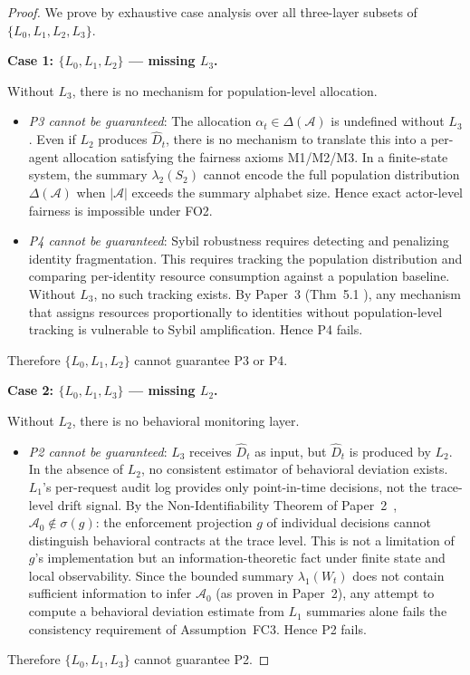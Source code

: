 \documentclass[11pt]{article}
\newcommand{\Agents}{\mathcal{A}}
\newcommand{\Dhat}{\widehat{D}}
\newcommand{\Azero}{\mathcal{A}_0}
\newcommand{\Layer}[1]{L_{#1}}
\newcommand{\State}[1]{S_{#1}}
\newcommand{\Sum}[1]{\lambda_{#1}}
\begin{document}
\begin{proof}
We prove by exhaustive case analysis over all three-layer subsets of
$\{\Layer{0}, \Layer{1}, \Layer{2}, \Layer{3}\}$.

\medskip
\noindent\textbf{Case 1: $\{\Layer{0}, \Layer{1}, \Layer{2}\}$ --- missing
$\Layer{3}$.}

Without $\Layer{3}$, there is no mechanism for population-level allocation.
\begin{itemize}[noitemsep]
  \item \emph{P3 cannot be guaranteed}: The allocation $\alpha_t \in
    \Delta(\Agents)$ is undefined without $\Layer{3}$. Even if $\Layer{2}$
    produces $\Dhat_t$, there is no mechanism to translate this into a
    per-agent allocation satisfying the fairness axioms M1/M2/M3. In a
    finite-state system, the summary $\Sum{2}(\State{2})$ cannot encode the
    full population distribution $\Delta(\Agents)$ when $|\Agents|$ exceeds
    the summary alphabet size. Hence exact actor-level fairness is impossible
    under FO2.

  \item \emph{P4 cannot be guaranteed}: Sybil robustness requires detecting
    and penalizing identity fragmentation. This requires tracking the
    population distribution and comparing per-identity resource consumption
    against a population baseline. Without $\Layer{3}$, no such tracking
    exists. By Paper~3 (Thm~5.1 \cite{fairgov26}), any mechanism that assigns
    resources proportionally to identities without population-level tracking
    is vulnerable to Sybil amplification. Hence P4 fails.
\end{itemize}
Therefore $\{\Layer{0},\Layer{1},\Layer{2}\}$ cannot guarantee P3 or P4.

\medskip
\noindent\textbf{Case 2: $\{\Layer{0}, \Layer{1}, \Layer{3}\}$ --- missing
$\Layer{2}$.}

Without $\Layer{2}$, there is no behavioral monitoring layer.
\begin{itemize}[noitemsep]
  \item \emph{P2 cannot be guaranteed}: $\Layer{3}$ receives $\Dhat_t$ as
    input, but $\Dhat_t$ is produced by $\Layer{2}$. In the absence of
    $\Layer{2}$, no consistent estimator of behavioral deviation exists.
    $\Layer{1}$'s per-request audit log provides only point-in-time decisions,
    not the trace-level drift signal. By the Non-Identifiability Theorem of
    Paper~2~\cite{fernandez2026c}, $\Azero \notin \sigma(g)$: the enforcement
    projection $g$ of individual decisions cannot distinguish behavioral
    contracts at the trace level. This is not a limitation of $g$'s
    implementation but an information-theoretic fact under finite state and
    local observability. Since the bounded summary $\Sum{1}(W_t)$ does not
    contain sufficient information to infer $\Azero$ (as proven in
    Paper~2), any attempt to compute a behavioral deviation estimate from
    $\Layer{1}$ summaries alone fails the consistency requirement of
    Assumption~FC3. Hence P2 fails.
\end{itemize}
Therefore $\{\Layer{0},\Layer{1},\Layer{3}\}$ cannot guarantee P2.


\end{proof}
\end{document}
